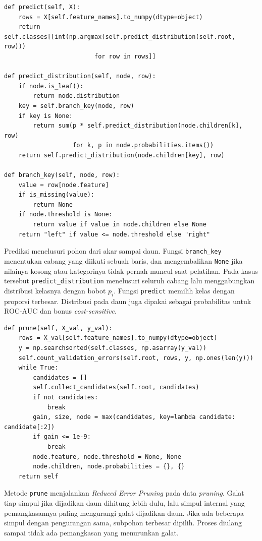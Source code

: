 \begin{lstlisting}
def predict(self, X):
    rows = X[self.feature_names].to_numpy(dtype=object)
    return self.classes[[int(np.argmax(self.predict_distribution(self.root, row)))
                         for row in rows]]

def predict_distribution(self, node, row):
    if node.is_leaf():
        return node.distribution
    key = self.branch_key(node, row)
    if key is None:
        return sum(p * self.predict_distribution(node.children[k], row)
                   for k, p in node.probabilities.items())
    return self.predict_distribution(node.children[key], row)

def branch_key(self, node, row):
    value = row[node.feature]
    if is_missing(value):
        return None
    if node.threshold is None:
        return value if value in node.children else None
    return "left" if value <= node.threshold else "right"
\end{lstlisting}

Prediksi menelusuri pohon dari akar sampai daun. Fungsi \texttt{branch\_key}
menentukan cabang yang diikuti sebuah baris, dan mengembalikan \texttt{None}
jika nilainya kosong atau kategorinya tidak pernah muncul saat pelatihan. Pada
kasus tersebut \texttt{predict\_distribution} menelusuri seluruh cabang lalu
menggabungkan distribusi kelasnya dengan bobot $p_i$. Fungsi \texttt{predict}
memilih kelas dengan proporsi terbesar. Distribusi pada daun juga dipakai
sebagai probabilitas untuk ROC-AUC dan bonus \textit{cost-sensitive}.

\begin{lstlisting}
def prune(self, X_val, y_val):
    rows = X_val[self.feature_names].to_numpy(dtype=object)
    y = np.searchsorted(self.classes, np.asarray(y_val))
    self.count_validation_errors(self.root, rows, y, np.ones(len(y)))
    while True:
        candidates = []
        self.collect_candidates(self.root, candidates)
        if not candidates:
            break
        gain, size, node = max(candidates, key=lambda candidate: candidate[:2])
        if gain <= 1e-9:
            break
        node.feature, node.threshold = None, None
        node.children, node.probabilities = {}, {}
    return self
\end{lstlisting}

Metode \texttt{prune} menjalankan \textit{Reduced Error Pruning} pada data
\textit{pruning}. Galat tiap simpul jika dijadikan daun dihitung lebih dulu,
lalu simpul internal yang pemangkasannya paling mengurangi galat dijadikan daun.
Jika ada beberapa simpul dengan pengurangan sama, subpohon terbesar dipilih.
Proses diulang sampai tidak ada pemangkasan yang menurunkan galat.

